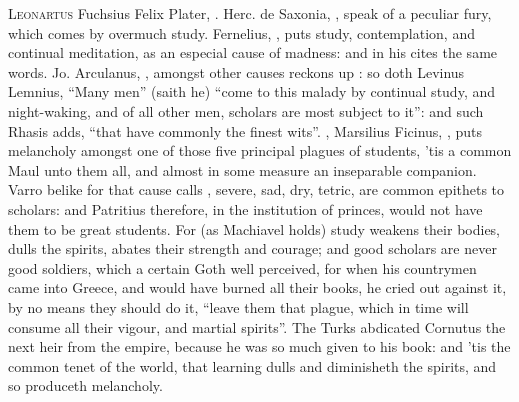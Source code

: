 \lettrine{L}{eonartus} Fuchsius  Felix Plater, .
Herc. de Saxonia, , speak
of a peculiar fury, which comes by overmuch study.
Fernelius, , puts
study, contemplation, and continual meditation, as an especial cause of
madness: and in his  cites the same words. Jo.
Arculanus, ,
amongst other causes reckons up : so doth Levinus Lemnius,
\enquote{Many men} (saith he) \enquote{come to this malady by continual
study, and night-waking, and of all other men, scholars
are most subject to it}: and such Rhasis adds, \enquote{that have
commonly the finest wits}. ,
Marsilius Ficinus, ,
puts melancholy amongst one of those five principal plagues of students, 'tis a
common Maul unto them all, and almost in some measure an inseparable companion.
Varro belike for that cause calls , severe,
sad, dry, tetric, are common epithets to scholars: and
Patritius therefore, in the institution of princes, would
not have them to be great students. For (as Machiavel holds) study weakens
their bodies, dulls the spirits, abates their strength and courage; and good
scholars are never good soldiers, which a certain Goth well perceived, for when
his countrymen came into Greece, and would have burned all their books, he
cried out against it, by no means they should do it,
\enquote{leave them that plague, which in time will consume all
their vigour, and martial spirits}. The Turks abdicated
Cornutus the next heir from the empire, because he was so much given to his
book: and 'tis the common tenet of the world, that learning dulls and
diminisheth the spirits, and so  produceth melancholy.

